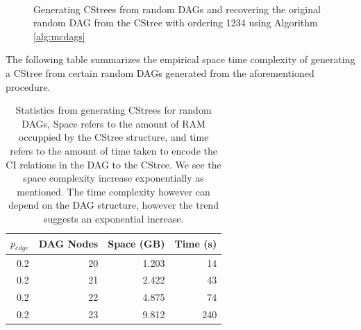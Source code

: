 \documentclass{tufte-book}
\begin{document}
\begin{figure}[!h]\label{fig:dagtocstree_cstree}
   \begin{floatrow}
%
\
\caption{Generating CStrees from random DAGs and recovering the original random DAG from the CStree with ordering 1234 using Algorithm \ref{alg:mcdags}}
        
   \end{floatrow}
\end{figure}


The following table summarizes the empirical space time complexity of generating a CStree from certain random DAGs generated from the aforementioned procedure.

\begin{table}[htbp]
\caption{Statistics from generating CStrees for random DAGs, Space refers to the amount of RAM occuppied by the CStree structure, and time refers to the amount of time taken to encode the CI relations in the DAG to the CStree. We see the space complexity increase exponentially as mentioned. The time complexity however can depend on the DAG structure, however the trend suggests an exponential increase.}
\centering
\begin{tabular}{r|r|r|r}
\hline
\(p_{edge}\) & DAG Nodes & Space  (GB) & Time  (s)\\
\hline
0.2 & 20 & 1.203 & 14\\
0.2 & 21 & 2.422 & 43\\
0.2 & 22 & 4.875 & 74\\
0.2 & 23 & 9.812 & 240\\
\end{tabular}
\end{table}
\end{document}
